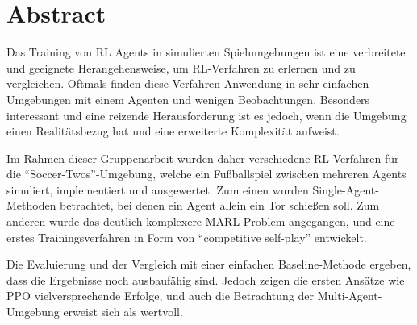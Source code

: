 \chapter*{Abstract}

Das Training von \ac{RL} Agents in simulierten Spielumgebungen ist eine verbreitete und geeignete Herangehensweise, um \ac{RL}-Verfahren zu erlernen und zu vergleichen. Oftmals finden diese Verfahren Anwendung in sehr einfachen Umgebungen mit einem Agenten und wenigen Beobachtungen. Besonders interessant und eine reizende Herausforderung ist es jedoch, wenn die Umgebung einen Realitätsbezug hat und eine erweiterte Komplexität aufweist.

Im Rahmen dieser Gruppenarbeit wurden daher verschiedene \ac{RL}-Verfahren für die \enquote{Soccer-Twos}-Umgebung, welche ein Fußballspiel zwischen mehreren Agents simuliert, implementiert und ausgewertet. Zum einen wurden Single-Agent-Methoden betrachtet, bei denen ein Agent allein ein Tor schießen soll. Zum anderen wurde das deutlich komplexere \ac{MARL} Problem angegangen, und eine erstes Trainingsverfahren in Form von \enquote{competitive self-play} entwickelt.

Die Evaluierung und der Vergleich mit einer einfachen Baseline-Methode ergeben, dass die Ergebnisse noch ausbaufähig sind. Jedoch zeigen die ersten Ansätze wie \ac{PPO} vielversprechende Erfolge, und auch die Betrachtung der Multi-Agent-Umgebung erweist sich als wertvoll.